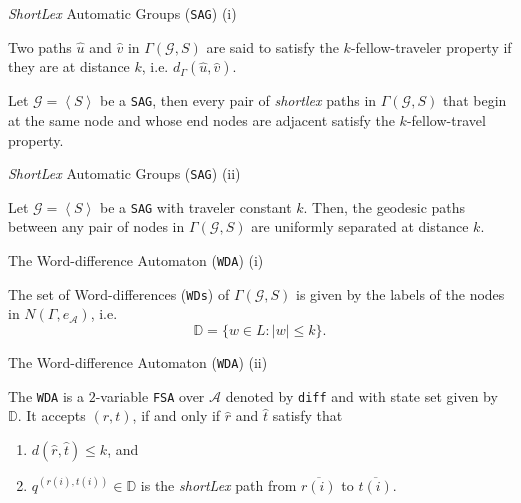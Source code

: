 \begin{frame}{\textit{ShortLex} Automatic Groups (\texttt{SAG}) (i)}

\begin{definition}
Two paths $\widehat{u}$ and $\widehat{v}$ in  $\Gamma(\mathcal{G},S)$ are said to satisfy the $k$-fellow-traveler property if they are at distance $k$, i.e. $d_\Gamma(\widehat{u},\widehat{v})$.
\end{definition}

\begin{definition}
Let $\mathcal{G}=\left\langle S\right\rangle$ be a \texttt{SAG}, then every pair of \textit{shortlex} paths in $\Gamma(\mathcal{G},S)$ that begin at the same node and whose end nodes are adjacent satisfy the $k$-fellow-travel property.
\end{definition}

\end{frame}

\begin{frame}{\textit{ShortLex} Automatic Groups (\texttt{SAG}) (ii)}

\begin{fact}
Let $\mathcal{G}=\left\langle S\right\rangle$ be a \texttt{SAG} with traveler constant $k$. Then, the geodesic paths between any pair of nodes in $\Gamma(\mathcal{G},S)$ are uniformly separated at distance $k$.
\end{fact}

\end{frame}

\begin{frame}{The Word-difference Automaton (\texttt{WDA}) (i)}

\begin{definition}
The set of Word-differences (\texttt{WDs}) of $\Gamma(\mathcal{G},S)$ is given by the labels of the nodes in $N(\Gamma,e_\mathcal{A})$, i.e.
$$\mathbb{D}=\{w\in L:|w|\leq k\}.$$
\end{definition}

\end{frame}

\begin{frame}{The Word-difference Automaton (\texttt{WDA}) (ii)}

\begin{definition}
The \texttt{WDA} is a $2$-variable \texttt{FSA} over $\mathcal{A}$ denoted by \texttt{diff} and with state set given by $\mathbb{D}$. It accepts $(r,t)$, if and only if
$\widehat{r}$ and $\widehat{t}$ satisfy that
\begin{enumerate}
    \item $d(\widehat{r},\widehat{t})\leq k$, and
    \item $q^{(r(i),t(i))}\in \mathbb{D}$ is the \textit{shortLex} path from $\overline{r(i)}$ to $\overline{t(i)}$. 
\end{enumerate}
\end{definition}

\end{frame}